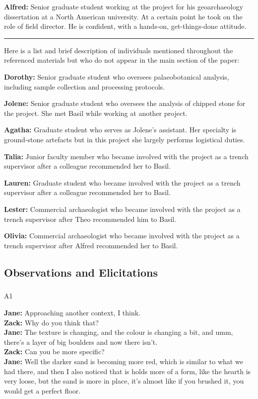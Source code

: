 \documentclass[
]{article}
\makeatletter
\let\oldsubparagraph\subparagraph
\renewcommand{\subparagraph}{
    \@ifstar
      \xxxSubParagraphStar
      \xxxSubParagraphNoStar
  }
\newcommand{\xxxSubParagraphStar}[1]{\oldsubparagraph*{#1}\mbox{}}
\newcommand{\xxxSubParagraphNoStar}[1]{\oldsubparagraph{#1}\mbox{}}
\makeatother
\begin{document}
\textbf{Alfred:} Senior graduate student working at the project for his
geoarchaeology dissertation at a North American university. At a certain
point he took on the role of field director. He is confident, with a
hands-on, get-things-done attitude.

\begin{center}\rule{0.5\linewidth}{0.5pt}\end{center}

Here is a list and brief description of individuals mentioned throughout
the referenced materials but who do not appear in the main section of
the paper:

\textbf{Dorothy:} Senior graduate student who oversees palaeobotanical
analysis, including sample collection and processing protocols.

\textbf{Jolene:} Senior graduate student who oversees the analysis of
chipped stone for the project. She met Basil while working at another
project.

\textbf{Agatha:} Graduate student who serves as Jolene's assistant. Her
specialty is ground-stone artefacts but in this project she largely
performs logistical duties.

\textbf{Talia:} Junior faculty member who became involved with the
project as a trench supervisor after a colleague recommended her to
Basil.

\textbf{Lauren:} Graduate student who became involved with the project
as a trench supervisor after a colleague recommended her to Basil.

\textbf{Lester:} Commercial archaeologist who became involved with the
project as a trench supervisor after Theo recommended him to Basil.

\textbf{Olivia:} Commercial archaeologist who became involved with the
project as a trench supervisor after Alfred recommended her to Basil.

\subsection{Observations and
Elicitations}\label{observations-and-elicitations}

\subparagraph{A1}\label{sec-A1}

\textbf{Jane:} Approaching another context, I think.\\
\textbf{Zack:} Why do you think that?\\
\textbf{Jane:} The texture is changing, and the colour is changing a
bit, and umm, there's a layer of big boulders and now there isn't.\\
\textbf{Zack:} Can you be more specific?\\
\textbf{Jane:} Well the darker sand is becoming more red, which is
similar to what we had there, and then I also noticed that is holds more
of a form, like the hearth is very loose, but the sand is more in place,
it's almost like if you brushed it, you would get a perfect floor.
\end{document}
